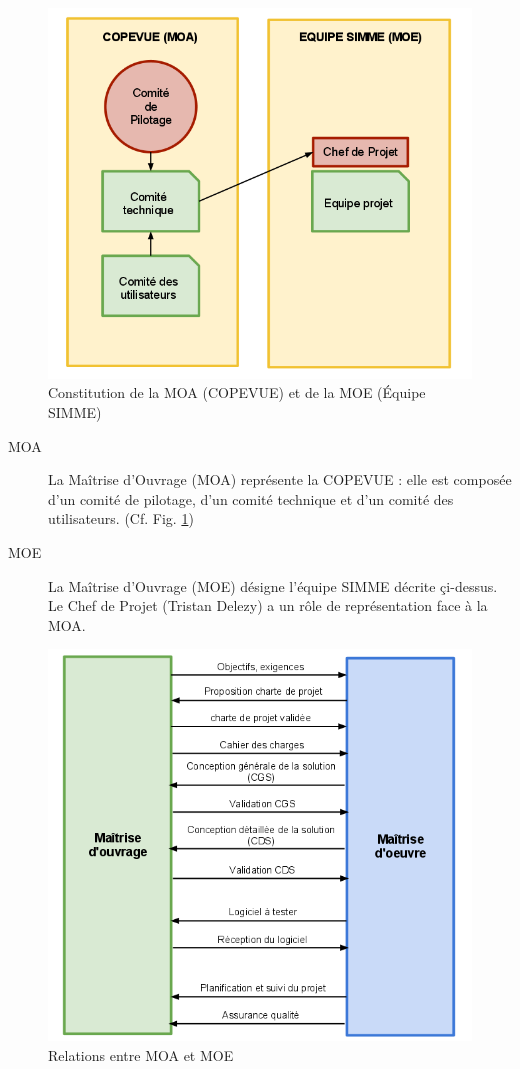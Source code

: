 \documentclass{mise_en_page}
\begin{document}
\begin{figure}[H]
	\centering
	\includegraphics[width=150mm]{MOASIMME.png}
	\caption{\label{MOA} Constitution de la MOA (COPEVUE) et de la MOE (Équipe SIMME)}
\end{figure}

\begin{description}
	\item[MOA]
		La Maîtrise d'Ouvrage (MOA) représente la COPEVUE : elle est composée d'un comité de pilotage, d'un comité technique et d'un comité des utilisateurs. (Cf. Fig. \ref{MOA})
	\item[MOE]
		La Maîtrise d'Ouvrage (MOE) désigne l'équipe SIMME décrite çi-dessus. Le Chef de Projet (Tristan Delezy) a un rôle de représentation face à la MOA.
\end{description}

\begin{figure}[H]
	\centering
	\includegraphics[width=150mm]{MOAMOE.png}
	\caption{\label{MOE} Relations entre MOA et MOE}
\end{figure}
\end{document}
